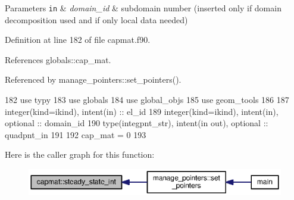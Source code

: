\begin{DoxyParams}[1]{Parameters}
\mbox{\tt in}  & {\em domain\+\_\+id} & subdomain number (inserted only if domain decomposition used and if only local data needed) \\
\hline
\end{DoxyParams}


Definition at line 182 of file capmat.\+f90.



References globals\+::cap\+\_\+mat.



Referenced by manage\+\_\+pointers\+::set\+\_\+pointers().


\begin{DoxyCode}
182       \textcolor{keywordtype}{use }typy
183       \textcolor{keywordtype}{use }globals
184       \textcolor{keywordtype}{use }global_objs
185       \textcolor{keywordtype}{use }geom_tools
186 
187       \textcolor{keywordtype}{integer(kind=ikind)}, \textcolor{keywordtype}{intent(in)} :: el\_id
189       \textcolor{keywordtype}{integer(kind=ikind)}, \textcolor{keywordtype}{intent(in)}, \textcolor{keywordtype}{optional} :: domain\_id
190       \textcolor{keywordtype}{type}(integpnt_str), \textcolor{keywordtype}{intent(in out)}, \textcolor{keywordtype}{optional} :: quadpnt\_in
191 
192       cap_mat = 0
193 
\end{DoxyCode}


Here is the caller graph for this function\+:\nopagebreak
\begin{figure}[H]
\begin{center}
\leavevmode
\includegraphics[width=350pt]{namespacecapmat_afecac6837e09fc605aebc33c4f516259_icgraph}
\end{center}
\end{figure}


